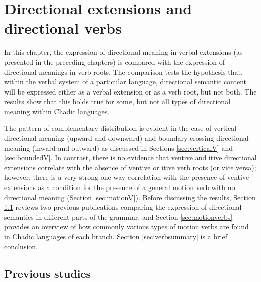 
\chapter{Directional extensions and directional verbs} \label{ch:verbs}


In this chapter, the expression of directional meaning in verbal extensions (as presented in the preceding chapters) is compared with the expression of directional meanings in verb roots. The comparison tests the hypothesis that, within the verbal system of a particular language, directional semantic content will be expressed either as a verbal extension or as a verb root, but not both. The results show that this holds true for some, but not all types of directional meaning within Chadic languages.

The pattern of complementary distribution is evident in the case of vertical directional meaning (upward and downward) and boundary-crossing directional meaning (inward and outward) as discussed in Sections \ref{sec:verticalV} and \ref{sec:boundedV}. In contrast, there is no evidence that ventive and itive directional extensions correlate with the absence of ventive or itive verb roots (or vice versa); however, there is a very strong one-way correlation with the presence of ventive extensions as a condition for the presence of a general motion verb with no directional meaning (Section \ref{sec:motionV}). Before discussing the results, Section \ref{sec:previous} reviews two previous publications comparing the expression of directional semantics in different parts of the grammar, and Section \ref{sec:motionverbs} provides an overview of how commonly various types of motion verbs are found in Chadic languages of each branch. Section \ref{sec:verbsummary} is a brief conclusion.

\section{Previous studies} \label{sec:previous}

